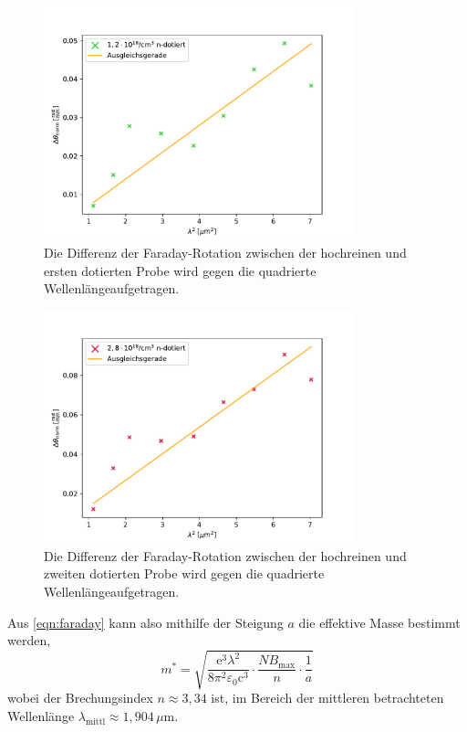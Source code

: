         \begin{figure}[h]
            \centering
            \includegraphics[width = 0.8\textwidth]{plots/Faraday_1.pdf}
            \caption{Die Differenz der Faraday-Rotation zwischen der hochreinen und ersten dotierten Probe wird gegen die quadrierte Wellenlängeaufgetragen.}
            \label{fig:Faraday_1}
        \end{figure}

        \FloatBarrier

        \begin{figure}[h]
            \centering
            \includegraphics[width = 0.8\textwidth]{plots/Faraday_2.pdf}
            \caption{Die Differenz der Faraday-Rotation zwischen der hochreinen und zweiten dotierten Probe wird gegen die quadrierte Wellenlängeaufgetragen.}
            \label{fig:Faraday_2}
        \end{figure}

        \FloatBarrier

        Aus \eqref{eqn:faraday} kann also mithilfe der Steigung $a$ die effektive Masse bestimmt werden,
        \begin{equation*}
            m^* = \sqrt{\frac{\text{e}^3 \lambda^2}{8\pi^2\varepsilon_0 \text{c}^3} \cdot \frac{N B_{\text{max}}}{n} \cdot \frac{1}{a}}
        \end{equation*}
        wobei der Brechungsindex $n \approx 3,34$ ist, im Bereich der mittleren betrachteten Wellenlänge $\lambda_{\text{mittl}} \approx 1,904 \, \mu$m.

